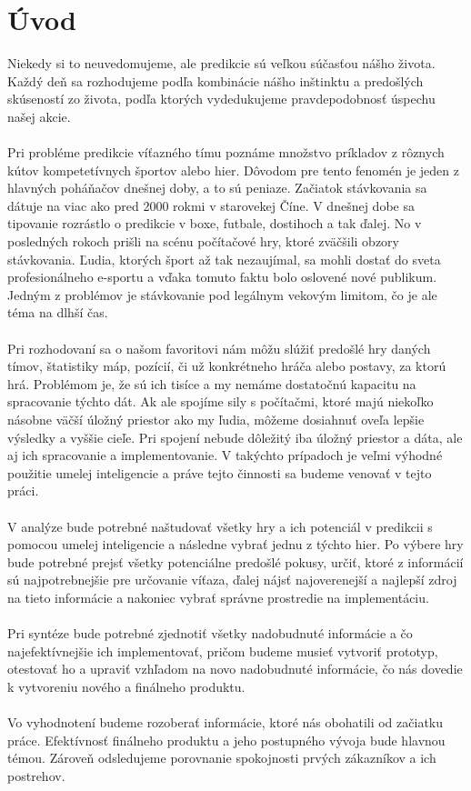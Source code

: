 
{}

\chapter*{Úvod}


Niekedy si to neuvedomujeme, ale predikcie sú veľkou súčasťou nášho života. Každý deň sa rozhodujeme podľa kombinácie nášho inštinktu a predošlých skúseností zo života, podľa ktorých vydedukujeme pravdepodobnosť úspechu našej akcie. 
\\ \\
Pri probléme predikcie víťazného tímu poznáme množstvo príkladov z rôznych kútov kompetetívnych športov alebo hier. Dôvodom pre tento fenomén je jeden z hlavných poháňačov dnešnej doby, a to sú peniaze. Začiatok stávkovania sa dátuje na viac ako pred 2000 rokmi v starovekej Číne. \cite{gamblinghistory}  V dnešnej dobe sa tipovanie rozrástlo o predikcie v boxe, futbale, dostihoch a tak ďalej. No v posledných rokoch prišli na scénu počítačové hry, ktoré zväčšili obzory stávkovania. Ľudia, ktorých šport až tak nezaujímal, sa mohli dostať do sveta profesionálneho e-sportu a vďaka tomuto faktu bolo oslovené nové publikum. Jedným z problémov je stávkovanie pod legálnym vekovým limitom, čo je ale téma na dlhší čas. 
\\ \\
Pri rozhodovaní sa o našom favoritovi nám môžu slúžiť predošlé hry daných tímov, štatistiky máp, pozícií, či už konkrétneho hráča alebo postavy, za ktorú hrá. Problémom je, že sú ich tisíce a my nemáme dostatočnú kapacitu na spracovanie týchto dát. Ak ale spojíme sily s počítačmi, ktoré majú niekoľko násobne väčší úložný priestor ako my ľudia, môžeme dosiahnuť oveľa lepšie výsledky a vyššie cieľe. Pri spojení nebude dôležitý iba úložný priestor a dáta, ale aj ich spracovanie a implementovanie. V takýchto prípadoch je veľmi výhodné použitie umelej inteligencie a práve tejto činnosti sa budeme venovať v tejto práci. 
\\ \\
V analýze bude potrebné naštudovať všetky hry a ich potenciál v predikcii s pomocou umelej inteligencie a následne vybrať jednu z týchto hier. Po výbere hry bude potrebné prejsť všetky potenciálne predošlé pokusy, určiť, ktoré z informácií sú najpotrebnejšie pre určovanie víťaza, ďalej nájsť najoverenejší a najlepší zdroj na tieto informácie a nakoniec vybrať správne prostredie na implementáciu.
\\ \\
Pri syntéze bude potrebné zjednotiť všetky nadobudnuté informácie a čo najefektívnejšie ich implementovať, pričom budeme musieť vytvoriť prototyp, otestovať ho a upraviť vzhľadom na novo nadobudnuté informácie, čo nás dovedie k vytvoreniu nového a finálneho produktu.
\\ \\
Vo vyhodnotení budeme rozoberať informácie, ktoré nás obohatili od začiatku práce. Efektívnosť finálneho produktu a jeho postupného vývoja bude hlavnou témou. Zároveň odsledujeme porovnanie spokojnosti prvých zákazníkov a ich postrehov.




